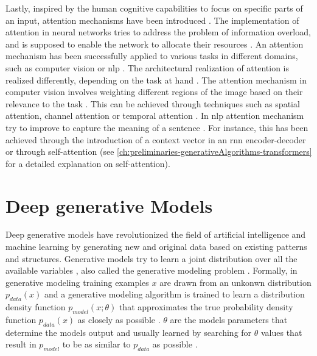 Lastly, inspired by the human cognitive capabilities to focus on specific parts of an input, attention mechanisms have been introduced \cite{niu2021ReviewAttentionMechanism, aggarwal2018NeuralNetworksDeep}.
The implementation of attention in neural networks tries to address the problem of information overload, and is supposed to enable the network to allocate their resources \cite{niu2021ReviewAttentionMechanism}.
An attention mechanism has been successfully applied to various tasks in different domains, such as computer vision or \gls{nlp} \cite{niu2021ReviewAttentionMechanism}.
The architectural realization of attention is realized differently, depending on the task at hand \cite{aggarwal2018NeuralNetworksDeep}.
The attention mechanism in computer vision involves weighting different regions of the image based on their relevance to the task \cite{aggarwal2018NeuralNetworksDeep}. 
This can be achieved through techniques such as spatial attention, channel attention or temporal attention \cite{guo2022AttentionMechanismsComputer}.
In \gls{nlp} attention mechanism try to improve to capture the meaning of a sentence \cite{niu2021ReviewAttentionMechanism}. 
For instance, this has been achieved through the introduction of a context vector in an \gls{rnn} encoder-decoder \cite{DBLP:journals/corr/BahdanauCB14} or through self-attention \cite{vaswani2017AttentionAllYou} (see \autoref{ch:preliminaries-generativeAlgorithms-transformers} for a detailed explanation on self-attention).


\section{Deep generative Models}
\label{ch:preliminaries-generativeMlgorithms}

Deep generative \glspl{model} have revolutionized the field of artificial intelligence and machine learning by generating new and original data based on existing patterns and structures. 
Generative models try to learn a joint distribution over all the available variables \cite{kingma2019IntroductionVariationalAutoencoders}, also called the generative modeling problem \cite{goodfellow2020GenerativeAdversarialNetworks}.
Formally, in generative modeling training examples $x$ are drawn from an unkonwn distribution $p_{data}(x)$ and a generative modeling algorithm is trained to learn a distribution density function $p_{model}(x;\theta)$ that approximates the true probability density function $p_{data}(x)$ as closely as possible \cite[p. 139]{goodfellow2020GenerativeAdversarialNetworks}.
$\theta$ are the models parameters that determine the models output and usually learned by searching for $\theta$ values that result in $p_{model}$ to be as similar to $p_{data}$ as possible \cite[p. 139]{goodfellow2020GenerativeAdversarialNetworks}.

